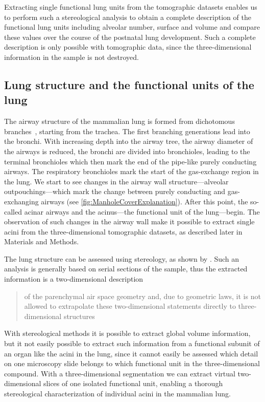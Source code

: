 \documentclass[%
	paper=a4,%
	abstract=true,%
	]{scrartcl}
\begin{document}
Extracting single functional lung units from the tomographic datasets enables us to perform such a stereological analysis to obtain a complete description of the functional lung units including alveolar number, surface and volume and compare these values over the course of the postnatal lung development. Such a complete description  is only possible with tomographic data, since the three-dimensional information in the sample is not destroyed.

\subsection{Lung structure and the functional units of the lung}
The airway structure of the mammalian lung is formed from dichotomous branches~\cite{Weibel1991}, starting from the trachea. The first branching generations lead into the bronchi. With increasing depth into the airway tree, the airway diameter of the airways is reduced, the bronchi are divided into bronchioles, leading to the terminal bronchioles which then mark the end of the pipe-like purely conducting airways. The respiratory bronchioles mark the start of the gas-exchange region in the lung. We start to see changes in the airway wall structure---alveolar outpouchings---which mark the change between purely conducting and gas-exchanging airways (see \autoref{fig:ManholeCoverExplanation}). After this point, the so-called acinar airways and the acinus---the functional unit of the lung---begin. The observation of such changes in the airway wall make it possible to extract single acini from the three-dimensional tomographic datasets, as described later in Materials and Methods.

The lung structure can be assessed using stereology, as shown by \citet{Tschanz2002}. Such an analysis is generally based on serial sections of the sample, thus the extracted information is a two-dimensional description \blockquote[\cite{Tschanz2002}]{of the parenchymal air space geometry and, due to geometric laws, it is not allowed to extrapolate these two-dimensional statements directly to three-dimensional structures}. With stereological methods it is possible to extract global volume information, but it not easily possible to extract such information from a functional subunit of an organ like the acini in the lung, since it cannot easily be assessed which detail on one microscopy slide belongs to which functional unit in the three-dimensional compound. With a three-dimensional segmentation we can extract virtual two-dimensional slices of one isolated functional unit, enabling a thorough stereological characterization of individual acini in the mammalian lung.
\end{document}
